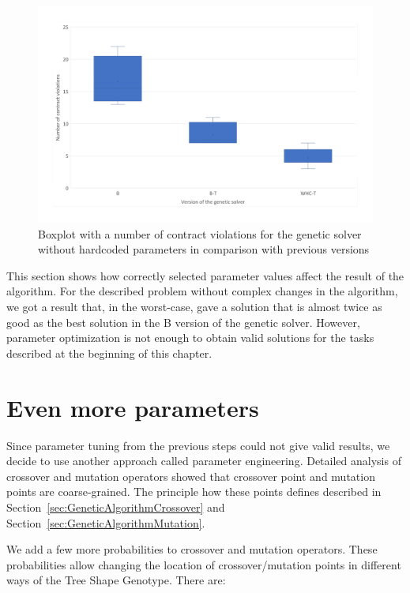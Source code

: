 \begin{figure}
	\centering
	\includegraphics[width=\textwidth]{images/BoxPlotSolverNoHardcodedTuning.pdf}
	\caption[Boxplot with a number of contract violations for the genetic solver without hardcoded parameters in comparison with previous versions]{Boxplot with a number of contract violations for the genetic solver without hardcoded parameters in comparison with previous versions}
	\label{fig:boxplotsolverNoHardcodedTuning}
\end{figure}

This section shows how correctly selected parameter values affect the result of the algorithm. For the described problem without complex changes in the algorithm, we got a result that, in the worst-case, gave a solution that is almost twice as good as the best solution in the B version of the genetic solver. However, parameter optimization is not enough to obtain valid solutions for the tasks described at the beginning of this chapter. 

\section{Even more parameters}\label{sec:NP}

Since parameter tuning from the previous steps could not give valid results, we decide to use another approach called parameter engineering.
Detailed analysis of crossover and mutation operators showed that crossover point and mutation points are coarse-grained. The principle how these points defines described in Section~\ref{sec:GeneticAlgorithmCrossover} and Section~\ref{sec:GeneticAlgorithmMutation}.

We add a few more probabilities to crossover and mutation operators. These probabilities allow changing the location of crossover/mutation points in different ways of the Tree Shape Genotype.
There are:
